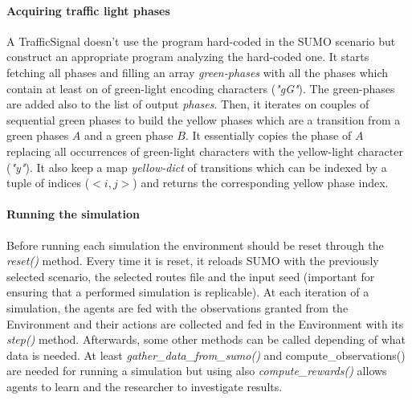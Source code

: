 \paragraph{Acquiring traffic light phases}

A TrafficSignal doesn't use the program hard-coded in the SUMO scenario but construct an appropriate program analyzing the hard-coded one.
It starts fetching all phases and filling an array \textit{green-phases} with all the phases which contain at least on of green-light encoding characters (\textit{"gG"}).
The green-phases are added also to the list of output \textit{phases}.
Then, it iterates on couples of sequential green phases to build the yellow phases which are a transition from a green phases $A$ and a green phase $B$. It essentially copies the phase of $A$ replacing all occurrences of green-light characters with the yellow-light character (\textit{"y"}).
It also keep a map \textit{yellow-dict} of transitions which can be indexed by a tuple of indices ($<i, j>$) and returns the corresponding yellow phase index.

\paragraph{Running the simulation}

Before running each simulation the environment should be reset through the \textit{reset()} method.
Every time it is reset, it reloads SUMO with the previously selected scenario, the selected routes file and the input seed (important for ensuring that a performed simulation is replicable).
At each iteration of a simulation, the agents are fed with the observations granted from the Environment and their actions are collected and fed in the Environment with its \textit{step()} method.
Afterwards, some other methods can be called depending of what data is needed. At least \textit{gather\_data\_from\_sumo()} and {compute\_observations()} are needed for running a simulation but using also \textit{compute\_rewards()} allows agents to learn and the researcher to investigate results.

